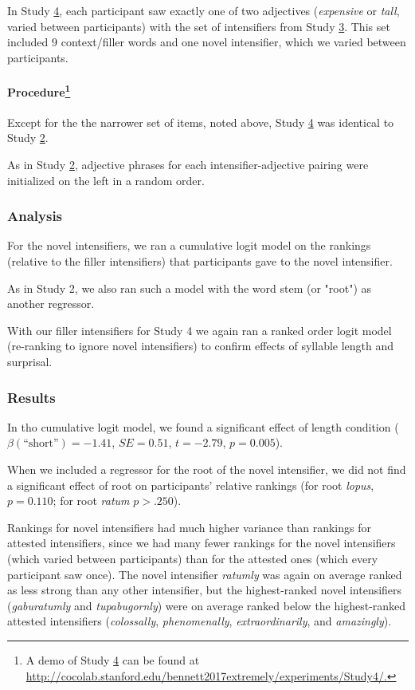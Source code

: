 \documentclass[10pt,letterpaper]{article}
\newcommand{\w}[1]{\emph{#1}}
\begin{document}
In Study \hyperref[sec:study4]{4}, each participant saw exactly one of two adjectives (\w{expensive} or \w{tall}, varied between participants) with the set of intensifiers from Study \hyperref[sec:study3]{3}. This set included 9 context/filler words and one novel intensifier, which we varied between participants.

\paragraph{Procedure\footnote{A demo of Study \hyperref[sec:study4]{4} can be found at \url{http://cocolab.stanford.edu/bennett2017extremely/experiments/Study4/.}}}

Except for the the narrower set of items, noted above, Study \hyperref[sec:study4]{4} was identical to Study \hyperref[sec:study2]{2}. 

As in Study \hyperref[sec:study2]{2}, adjective phrases for each intensifier-adjective pairing were initialized on the left in a random order.

\subsubsection{Analysis}

For the novel intensifiers, we ran a cumulative logit model on the rankings (relative to the filler intensifiers) that participants gave to the novel intensifier.

As in Study 2, we also ran such a model with the word stem (or "root") as another regressor.

With our filler intensifiers for Study 4 we again ran a ranked order logit model (re-ranking to ignore novel intensifiers) to confirm effects of syllable length and surprisal.

\subsubsection{Results}

In tho cumulative logit model, we found a significant effect of length condition ($\beta(\mbox{``short''})=-1.41$, $SE=0.51$, $t=-2.79$, $p=0.005$).

When we included a regressor for the root of the novel intensifier, we did not find a significant effect of root on participants' relative rankings (for root \w{lopus}, $p=0.110$; for root \w{ratum} $p>.250$).

Rankings for novel intensifiers had much higher variance than rankings for attested intensifiers, since we had many fewer rankings for the novel intensifiers (which varied between participants) than for the attested ones (which every participant saw once). The novel intensifier \w{ratumly} was again on average ranked as less strong than any other intensifier, but the highest-ranked novel intensifiers (\w{gaburatumly} and \w{tupabugornly}) were on average ranked below the highest-ranked attested intensifiers (\w{colossally}, \w{phenomenally}, \w{extraordinarily}, and \w{amazingly}).
\end{document}
